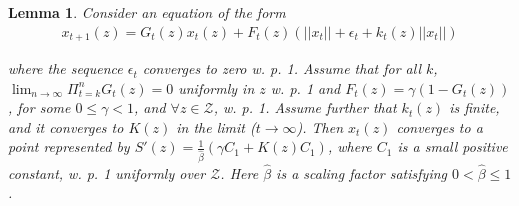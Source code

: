 \documentclass[jair, twoside,11pt,theapa]{article}
\newtheorem{lemm2}{Lemma}
\begin{document}
\begin{lemm2}
Consider an equation of the form
\begin{equation*}
    \begin{array}{l}
         x_{t+1}(z) = G_t(z) x_t(z) + F_t(z) (||x_t|| + \epsilon_t + k_t(z) ||x_t||)
    \end{array}
\end{equation*}

\noindent where the sequence $\epsilon_t $ converges to zero w. p. 1. Assume that for all $k$, $\lim_{n \xrightarrow{} \infty} \Pi_{t=k}^n G_t(z) = 0$ uniformly in $z$ w. p. 1 and $F_t(z) = \gamma(1 - G_t(z))$, for some $0 \leq \gamma < 1$, and $\forall z \in \mathcal{Z}$,  w. p. 1. Assume further that $k_t(z)$ is finite, and it converges to $K(z)$ in the limit ($t \xrightarrow{} \infty$). Then $x_t(z)$ converges to a point represented by $S'(z) = \frac{1}{\hat{\beta}} (\gamma C_1 + K(z) C_1) $, where $C_1$ is a small positive constant, w. p. 1 uniformly over $\mathcal{Z}$. Here $\hat{\beta}$ is a scaling factor satisfying $0 < \hat{\beta} \leq 1$. 




\end{lemm2}
\end{document}

